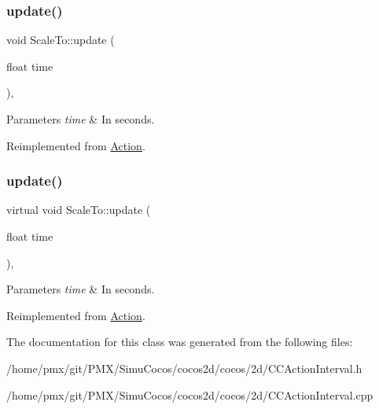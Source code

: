 \subsubsection{\texorpdfstring{update()}{update()}\hspace{0.1cm}{\footnotesize\ttfamily [1/2]}}
{\footnotesize\ttfamily void Scale\+To\+::update (\begin{DoxyParamCaption}\item[{float}]{time }\end{DoxyParamCaption})\hspace{0.3cm}{\ttfamily [override]}, {\ttfamily [virtual]}}


\begin{DoxyParams}{Parameters}
{\em time} & In seconds. \\
\hline
\end{DoxyParams}


Reimplemented from \hyperlink{classAction_a937e646e63915e33ad05ba149bfcf239}{Action}.

\mbox{\label{classScaleTo_ad02fb28920bffb05ba31ed1b92c70ef9}} 
\subsubsection{\texorpdfstring{update()}{update()}\hspace{0.1cm}{\footnotesize\ttfamily [2/2]}}
{\footnotesize\ttfamily virtual void Scale\+To\+::update (\begin{DoxyParamCaption}\item[{float}]{time }\end{DoxyParamCaption})\hspace{0.3cm}{\ttfamily [override]}, {\ttfamily [virtual]}}


\begin{DoxyParams}{Parameters}
{\em time} & In seconds. \\
\hline
\end{DoxyParams}


Reimplemented from \hyperlink{classAction_a937e646e63915e33ad05ba149bfcf239}{Action}.



The documentation for this class was generated from the following files\+:\begin{DoxyCompactItemize}
\item 
/home/pmx/git/\+P\+M\+X/\+Simu\+Cocos/cocos2d/cocos/2d/C\+C\+Action\+Interval.\+h\item 
/home/pmx/git/\+P\+M\+X/\+Simu\+Cocos/cocos2d/cocos/2d/C\+C\+Action\+Interval.\+cpp\end{DoxyCompactItemize}
